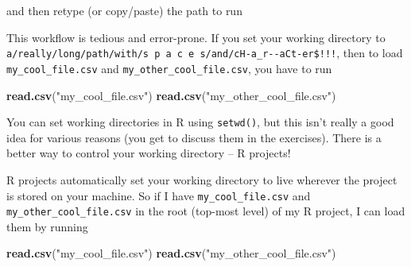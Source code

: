 \documentclass[
]{book}
\newenvironment{Shaded}{\begin{snugshade}}{\end{snugshade}}
\newcommand{\KeywordTok}[1]{\textcolor[rgb]{0.13,0.29,0.53}{\textbf{#1}}}
\newcommand{\NormalTok}[1]{#1}
\newcommand{\StringTok}[1]{\textcolor[rgb]{0.31,0.60,0.02}{#1}}
\begin{document}
\begin{Shaded}
\end{Shaded}

and then retype (or copy/paste) the path to run

\begin{Shaded}
\end{Shaded}

This workflow is tedious and error-prone. If you set your working directory to \texttt{a/really/long/path/with/s\ p\ a\ c\ e\ s/and/cH-a\_r-\/-aCt-er\$!!!}, then to load \texttt{my\_cool\_file.csv} and \texttt{my\_other\_cool\_file.csv}, you have to run

\begin{Shaded}
\begin{Highlighting}[]
\KeywordTok{read.csv}\NormalTok{(}\StringTok{"my_cool_file.csv"}\NormalTok{)}
\KeywordTok{read.csv}\NormalTok{(}\StringTok{"my_other_cool_file.csv"}\NormalTok{)}
\end{Highlighting}
\end{Shaded}

You can set working directories in R using \texttt{setwd()}, but this isn't really a good idea for various reasons (you get to discuss them in the exercises). There is a better way to control your working directory -- R projects!

R projects automatically set your working directory to live wherever the project is stored on your machine. So if I have \texttt{my\_cool\_file.csv} and \texttt{my\_other\_cool\_file.csv} in the root (top-most level) of my R project, I can load them by running

\begin{Shaded}
\begin{Highlighting}[]
\KeywordTok{read.csv}\NormalTok{(}\StringTok{"my_cool_file.csv"}\NormalTok{)}
\KeywordTok{read.csv}\NormalTok{(}\StringTok{"my_other_cool_file.csv"}\NormalTok{)}
\end{Highlighting}
\end{Shaded}
\end{document}
